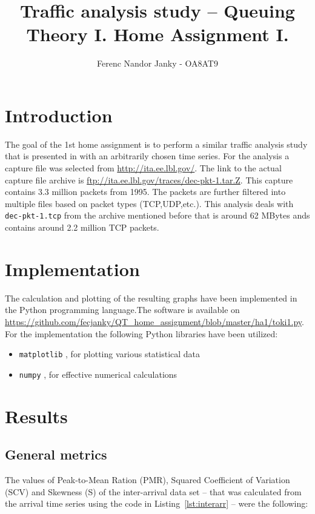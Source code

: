 \documentclass[a4paper]{article}
\title{Traffic analysis study – Queuing Theory I. Home Assignment I.}
\author{Ferenc Nandor Janky - OA8AT9}
\date{}
\begin{document}
\maketitle

\tableofcontents

\section{Introduction}

The goal of the 1st home assignment is to perform a similar traffic analysis study that is presented in \cite{MolnarOnburst} with an arbitrarily chosen time series.
For the analysis a capture file was selected from \url{http://ita.ee.lbl.gov/}. The link to the actual capture file archive is \url{ftp://ita.ee.lbl.gov/traces/dec-pkt-1.tar.Z}. This capture contains 3.3 million packets from 1995. The packets are further filtered into multiple files based on packet types (TCP,UDP,etc.). This analysis deals with \verb!dec-pkt-1.tcp! from the archive mentioned before that is around 62 MBytes ands contains around 2.2 million TCP packets.


\section{Implementation}

The calculation and plotting of the resulting graphs have been implemented in the Python programming language.The software is available on \url{https://github.com/fecjanky/QT_home_assignment/blob/master/ha1/toki1.py}.
For the implementation the following Python libraries have been utilized:

\begin{itemize}
\item \verb!matplotlib! , for plotting various statistical data
\item \verb!numpy! , for effective numerical calculations
\end{itemize}

\section{Results}

\subsection{General metrics}

The values of Peak-to-Mean Ration (PMR), Squared Coefficient of Variation (SCV) and Skewness (S) of the inter-arrival data set  -- that was calculated from the arrival time series using the code in Listing~\ref{lst:interarr} --
 were the following:
\end{document}
